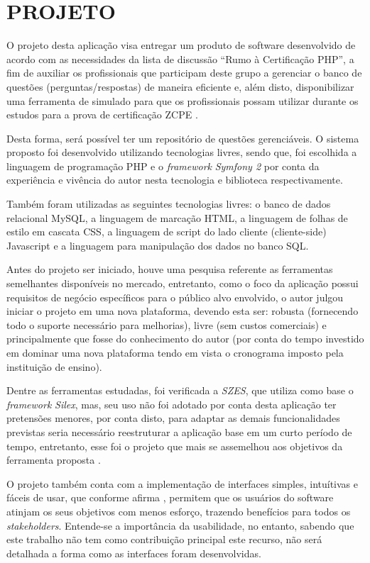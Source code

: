 \chapter{PROJETO}
\label{chp:projeto}

O projeto desta aplicação visa entregar um produto de software
desenvolvido de acordo com as necessidades da lista de discussão ``Rumo à
Certificação PHP'', a fim de auxiliar os profissionais que participam deste
grupo a gerenciar o banco de questões (perguntas/respostas) de maneira eficiente e,
além disto, disponibilizar uma ferramenta de simulado para que os profissionais 
possam utilizar durante os estudos para a prova de certificação \acs{ZCPE}
\cite{googleGroupsRumoACertificaoPHP}.

Desta forma, será possível ter um repositório de questões gerenciáveis. O
sistema proposto foi desenvolvido utilizando tecnologias livres, sendo 
que, foi escolhida a linguagem de programação \acs{PHP} e o
\textit{framework} \textit{Symfony 2} por conta da experiência e vivência do
autor nesta tecnologia e biblioteca respectivamente.

Também foram utilizadas as seguintes tecnologias livres: o banco de dados
relacional MySQL, a linguagem de marcação HTML, a linguagem de folhas de estilo 
em cascata CSS,  a linguagem de script do lado cliente (cliente-side) Javascript 
e a linguagem para manipulação dos dados no banco SQL.

Antes do projeto ser iniciado, houve uma pesquisa referente as ferramentas
semelhantes disponíveis no mercado, entretanto, como o foco da aplicação possui
requisitos de negócio específicos para o público alvo envolvido, o autor julgou
iniciar o projeto em uma nova plataforma, devendo esta ser: robusta (fornecendo
todo o suporte necessário para melhorias), livre (sem custos comerciais) e
principalmente que fosse do conhecimento do autor (por conta do tempo investido
em dominar uma nova plataforma tendo em vista o cronograma imposto pela
instituição de ensino).

Dentre as ferramentas estudadas, foi
verificada a \textit{SZES}, que utiliza como base o \textit{framework}
\textit{Silex}, mas, seu uso não foi adotado por conta desta aplicação
ter pretensões menores, por conta disto, para adaptar as demais funcionalidades
previstas seria necessário reestruturar a aplicação
base em um curto período de tempo, entretanto, esse foi o projeto que mais se
assemelhou aos objetivos da ferramenta proposta \cite{githubSZES}.

O projeto também conta com a implementação de interfaces simples, intuítivas e
fáceis de usar, que conforme afirma , permitem
que os usuários do software atinjam os seus objetivos com menos esforço,
trazendo benefícios para todos os \textit{stakeholders}. Entende-se a
importância da usabilidade, no entanto, sabendo que este trabalho não tem como
contribuição principal este recurso, não será detalhada a forma como as
interfaces foram desenvolvidas.

